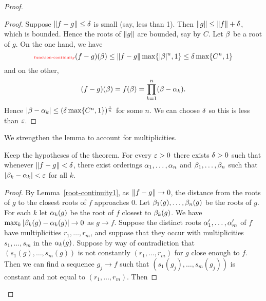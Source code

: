 \begin{proof}
\begin{proof}
Suppose $\left\Vert {f-g}\right\Vert\le\delta$ is small (say, less than 1). Then $\left\Vert {g}\right\Vert\le \left\Vert {f}\right\Vert+\delta$, which is bounded. Hence the roots of $\left\Vert {g}\right\Vert$ are bounded, say by $C$. Let $\beta$ be a root of $g$. On the one hand, we have
\begin{equation}\llabel{function-continuity}
(f-g)(\be)\le \ve{f-g}\max\{|\be|^n,1\}\le\de \max\{C^n,1\}
\end{equation}
and on the other,
\[
(f-g)(\beta)=f(\beta)=\prod_{k=1}^n (\beta-\alpha_k).
\]
Hence $|\beta-\alpha_k|\le (\delta \max\{C^n,1\})^{\frac{1}{n}}$ for some $n$. We can choose $\delta$ so this is less than $\varepsilon$.
\end{proof}
 We strengthen the lemma to account for multiplicities. 
\begin{lem}
Keep the hypotheses of the theorem. For every $\varepsilon>0$ there exists $\delta>0$ such that whenever $\left\Vert {f-g}\right\Vert<\delta$, there exist orderings $\alpha_1,\ldots, \alpha_n$ and $\beta_1,\ldots, \beta_n$ such that $|\beta_k-\alpha_k|<\varepsilon$ for all $k$.
\end{lem}
\begin{proof}
By Lemma~\ref{root-continuity1}, as $\left\Vert {f-g}\right\Vert\to 0$, the  distance from the roots of $g$ to the closest roots of $f$ approaches 0. %
%
Let $\beta_1(g),\ldots, \beta_n(g)$ be the roots of $g$. For each $k$ let $\alpha_k(g)$ be the root of $f$ closest to $\beta_k(g)$. We have $\max_k|\beta_k(g)-\alpha_k(g)|\to 0$ as $g\to f$. Suppose the distinct roots $\alpha_1',\ldots, \alpha_m'$ of $f$ have multiplicities $r_1,\ldots, r_m$, and suppose that they occur with multiplicities $s_1,\ldots, s_m$ in the $\alpha_k(g)$. Suppose by way of contradiction that $(s_1(g),\ldots, s_m(g))$ is not constantly $(r_1,\ldots, r_m)$ for $g$ close enough to $f$. Then we can find a sequence $g_j\to f$ such that $(s_1(g_j),\ldots, s_m(g_j))$ is constant and not equal to $(r_1,\ldots, r_m)$. Then

\end{proof}
\end{proof}

